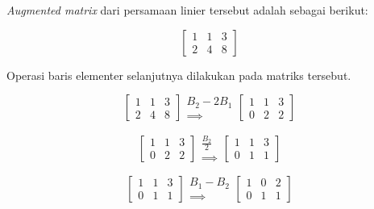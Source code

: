 \documentclass[]{book}
\theoremstyle{definition}
\theoremstyle{definition}
\theoremstyle{definition}
\theoremstyle{remark}
\begin{document}
\emph{Augmented matrix} dari persamaan linier tersebut adalah sebagai berikut:

\[
\begin{bmatrix}
     1 & 1 & 3     \\[0.3em]
     2 & 4 & 8
\end{bmatrix}
\]

Operasi baris elementer selanjutnya dilakukan pada matriks tersebut.

\begin{equation*}
\begin{bmatrix}
     1 & 1 & 3     \\[0.3em]
     2 & 4 & 8
\end{bmatrix}
\begin{matrix}
  B_2-2B_1 \\
  \implies 
\end{matrix}
\begin{bmatrix}
     1 & 1 & 3     \\[0.3em]
     0 & 2 & 2
\end{bmatrix}
\end{equation*}

\begin{equation*}
\begin{bmatrix}
     1 & 1 & 3     \\[0.3em]
     0 & 2 & 2
\end{bmatrix}
\begin{matrix}
  \frac{B_2}{2} \\
  \implies
\end{matrix}
\begin{bmatrix}
     1 & 1 & 3     \\[0.3em]
     0 & 1 & 1
\end{bmatrix}
\end{equation*}

\begin{equation*}
\begin{bmatrix}
     1 & 1 & 3     \\[0.3em]
     0 & 1 & 1
\end{bmatrix}
\begin{matrix}
  B_1-B_2 \\
  \implies
\end{matrix}
\begin{bmatrix}
     1 & 0 & 2     \\[0.3em]
     0 & 1 & 1
\end{bmatrix}
\end{equation*}
\end{document}
